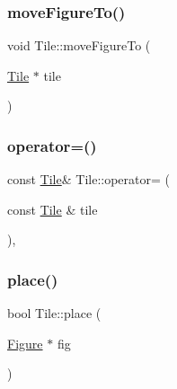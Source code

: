 \mbox{\label{classTile_a69a295280f0ab2c2e5325ed3aabaf54e}} 
\subsubsection{\texorpdfstring{move\+Figure\+To()}{moveFigureTo()}}
{\footnotesize\ttfamily void Tile\+::move\+Figure\+To (\begin{DoxyParamCaption}\item[{\hyperlink{classTile}{Tile} $\ast$}]{tile }\end{DoxyParamCaption})\hspace{0.3cm}{\ttfamily [inline]}}

\mbox{\label{classTile_a75da44d88e876130202f7dfddec72121}} 
\subsubsection{\texorpdfstring{operator=()}{operator=()}}
{\footnotesize\ttfamily const \hyperlink{classTile}{Tile}\& Tile\+::operator= (\begin{DoxyParamCaption}\item[{const \hyperlink{classTile}{Tile} \&}]{tile }\end{DoxyParamCaption})\hspace{0.3cm}{\ttfamily [private]}, {\ttfamily [delete]}}

\mbox{\label{classTile_a1cb171d83f6942aebd2499bc2c678f7f}} 
\subsubsection{\texorpdfstring{place()}{place()}}
{\footnotesize\ttfamily bool Tile\+::place (\begin{DoxyParamCaption}\item[{\hyperlink{classFigure}{Figure} $\ast$}]{fig }\end{DoxyParamCaption})\hspace{0.3cm}{\ttfamily [inline]}}

\mbox{\label{classTile_a872043e678348699184b5d55efb4c6d3}} 
